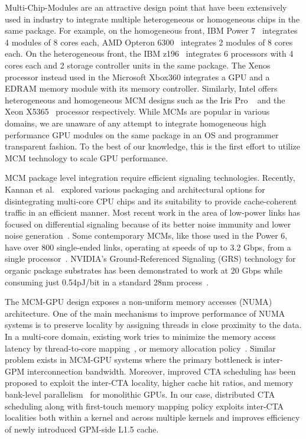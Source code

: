 Multi-Chip-Modules are an attractive design point that have
been extensively used in industry to integrate multiple heterogeneous
or homogeneous chips in the same package. For example, on the
homogeneous front, IBM Power 7~\cite{IBM:Power} integrates 4 modules
of 8 cores each, AMD Opteron 6300~\cite{AMD:Opteron} integrates 2
modules of 8 cores each. On the heterogeneous front, the IBM
z196~\cite{IBM:z196} integrates 6 processors with 4 cores each and 2
storage controller units in the same package. The
Xenos~\cite{ATI:Xenos} processor instead used in the Microsoft Xbox360
integrates a GPU and a EDRAM memory module with its memory controller.
Similarly, Intel offers heterogeneous and homogeneous MCM designs such
as the Iris Pro ~\cite{Intel:IrisPro} and the Xeon
X5365~\cite{Intel:Xeon} processor respectively. While MCMs are popular
in various domains, we are unaware of any attempt to integrate
homogeneous high performance GPU modules on the same package in an OS
and programmer transparent fashion. To the best of our knowledge, this
is the first effort to utilize MCM technology to scale GPU
performance.

MCM package level integration require efficient signaling
technologies. Recently, Kannan et al.~\cite{kannan2015} explored
various packaging and architectural options for disintegrating
multi-core CPU chips and its suitability to provide cache-coherent
traffic in an efficient manner. 
Most recent work in the area of low-power
links has focused on differential signaling because of its better
noise immunity and lower noise
generation~\cite{Poulton2007,Mansuri2013}. Some contemporary MCMs,
like those used in the Power 6, have over 800 single-ended links,
operating at speeds of up to 3.2 Gbps, from a single
processor~\cite{Dreps2007}. NVIDIA's Ground-Referenced Signaling (GRS)
technology for organic package substrates has been demonstrated to
work at 20 Gbps while consuming just 0.54pJ/bit in a standard 28nm
process~\cite{poulton2013}.

The MCM-GPU design exposes a non-uniform memory accesses (NUMA)
architecture. One of the main mechanisms to improve performance of
NUMA systems is to preserve locality by assigning threads in close
proximity to the data. In a multi-core domain, existing work tries to
minimize the memory access latency by thread-to-core
mapping~\cite{tam2007thread,blagodurov2010case,li1993locality}, or
memory allocation
policy~\cite{bolosky1989simple,larowe1991exploiting,dashti2013traffic}.
Similar problem exists in MCM-GPU systems where the primary bottleneck
is inter-GPM interconnection bandwidth. Moreover, improved CTA
scheduling has been proposed to exploit the inter-CTA locality, higher
cache hit ratios, and memory bank-level
parallelism~\cite{leehpca2014,mao2016temp,wanglaperm} for monolithic
GPUs. In our case, distributed CTA scheduling along with first-touch
memory mapping policy exploits inter-CTA localities both within a
kernel and across multiple kernels and improves efficiency of newly
introduced GPM-side L1.5 cache.

